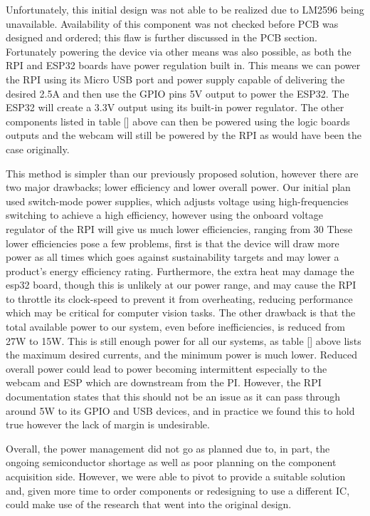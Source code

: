 Unfortunately, this initial design was not able to be realized due to LM2596 being unavailable.
Availability of this component was not checked before PCB was designed and ordered; this flaw is further discussed in the PCB section.
Fortunately powering the device via other means was also possible, as both the RPI and ESP32 boards have power regulation built in.
This means we can power the RPI using its Micro USB port and power supply capable of delivering the desired 2.5A and then use the GPIO pins 5V output to power the ESP32.
The ESP32 will create a 3.3V output using its built-in power regulator.
The other components listed in table [] above can then be powered using the logic boards outputs and the webcam will still be powered by the RPI as would have been the case originally.



This method is simpler than our previously proposed solution, however there are two major drawbacks; lower efficiency and lower overall power.
Our initial plan used switch-mode power supplies, which adjusts voltage using high-frequencies switching to achieve a high efficiency, however using the onboard voltage regulator of the RPI will give us much lower efficiencies, ranging from 30%
These lower efficiencies pose a few problems, first is that the device will draw more power as all times which goes against sustainability targets and may lower a product's energy efficiency rating.
Furthermore, the extra heat may damage the esp32 board, though this is unlikely at our power range, and may cause the RPI to throttle its clock-speed to prevent it from overheating, reducing performance which may be critical for computer vision tasks.
The other drawback is that the total available power to our system, even before inefficiencies, is reduced from 27W to 15W.
This is still enough power for all our systems, as table [] above lists the maximum desired currents, and the minimum power is much lower.
Reduced overall power could lead to power becoming intermittent especially to the webcam and ESP which are downstream from the PI.
However, the RPI documentation states that this should not be an issue as it can pass through around 5W to its GPIO and USB devices, and in practice we found this to hold true however the lack of margin is undesirable.


Overall, the power management did not go as planned due to, in part, the ongoing semiconductor shortage as well as poor planning on the component acquisition side.
However, we were able to pivot to provide a suitable solution and, given more time to order components or redesigning to use a different IC, could make use of the research that went into the original design.


